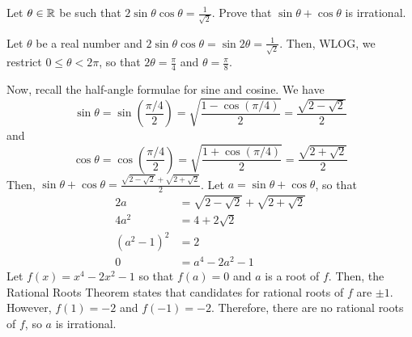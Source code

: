 \begin{prob}
  Let $\theta \in \mathbb{R}$ be such that $2\sin\theta\cos\theta = \frac{1}{\sqrt{2}}$.
  Prove that $\sin\theta+\cos\theta$ is irrational.
\end{prob}
\begin{prf}
  Let $\theta$ be a real number and $2\sin\theta\cos\theta = \sin 2\theta = \frac{1}{\sqrt{2}}$.
  Then, WLOG, we restrict $0 \leq \theta < 2\pi$,
  so that $2\theta = \frac{\pi}{4}$ and $\theta = \frac{\pi}{8}$.

  Now, recall the half-angle formulae for sine and cosine. We have
  \[ \sin\theta = \sin(\frac{\pi/4}{2}) = \sqrt{\frac{1-\cos(\pi/4)}{2}} = \frac{\sqrt{2-\sqrt{2}}}{2} \]
  and
  \[ \cos\theta = \cos(\frac{\pi/4}{2}) = \sqrt{\frac{1+\cos(\pi/4)}{2}} = \frac{\sqrt{2+\sqrt{2}}}{2} \]
  Then, $\sin\theta + \cos\theta = \frac{\sqrt{2-\sqrt{2}}+\sqrt{2+\sqrt{2}}}{2}$.
  Let $a = \sin\theta+\cos\theta$, so that
  \begin{align*}
    2a          & = \sqrt{2-\sqrt{2}}+\sqrt{2+\sqrt{2}} \\
    4a^2        & = 4+2\sqrt{2}                         \\
    (a^2 - 1)^2 & = 2                                   \\
    0           & = a^4 - 2a^2 -1
  \end{align*}
  Let $f(x) = x^4 - 2x^2 - 1$ so that $f(a) = 0$ and $a$ is a root of $f$.
  Then, the Rational Roots Theorem states that candidates for rational roots of $f$ are $\pm 1$.
  However, $f(1) = -2$ and $f(-1) = -2$.
  Therefore, there are no rational roots of $f$, so $a$ is irrational.
\end{prf}

